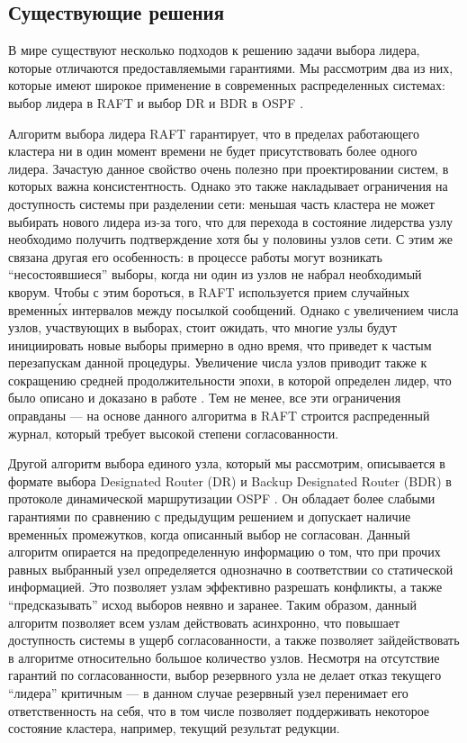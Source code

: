 \documentclass{article}
\theoremstyle{plain}
\theoremstyle{plain}
\theoremstyle{plain}
\theoremstyle{plain}
\theoremstyle{definition}
\theoremstyle{remark}
\theoremstyle{plain}
\begin{document}
\subsection{Существующие решения}

В мире существуют несколько подходов к решению задачи выбора лидера, которые отличаются предоставляемыми гарантиями. Мы рассмотрим два из них, которые имеют широкое применение в современных распределенных системах: выбор лидера в RAFT \cite{RAFT} и выбор DR и BDR в OSPF  \cite[с.~75]{RFC2328}.

Алгоритм выбора лидера RAFT гарантирует, что в пределах работающего кластера ни в один момент времени не будет присутствовать более одного лидера. Зачастую данное свойство очень полезно при проектировании систем, в которых важна консистентность. Однако это также накладывает ограничения на доступность системы при разделении сети: меньшая часть кластера не может выбирать нового лидера из-за того, что для перехода в состояние лидерства узлу необходимо получить подтверждение хотя бы у половины узлов сети. С этим же связана другая его особенность: в процессе работы могут возникать \enquote{несостоявшиеся} выборы, когда ни один из узлов не набрал необходимый кворум. Чтобы с этим бороться, в RAFT используется прием случайных временн\'{ы}х интервалов между посылкой сообщений. Однако с увеличением числа узлов, участвующих в выборах, стоит ожидать, что многие узлы будут инициировать новые выборы примерно в одно время, что приведет к частым перезапускам данной процедуры. Увеличение числа узлов приводит также к сокращению средней продолжительности эпохи, в которой определен лидер, что было описано и доказано в работе \cite{RAFT_performance_1808.01081}. Тем не менее, все эти ограничения оправданы --- на основе данного алгоритма в RAFT строится распреденный журнал, который требует высокой степени согласованности.

Другой алгоритм выбора единого узла, который мы рассмотрим, описывается в формате выбора Designated Router (DR) и Backup Designated Router (BDR) в протоколе динамической маршрутизации OSPF \cite[с.~75]{RFC2328}. Он обладает более слабыми гарантиями по сравнению с предыдущим решением и допускает наличие временн\'{ы}х промежутков, когда описанный выбор не согласован. Данный алгоритм опирается на предопределенную информацию о том, что при прочих равных выбранный узел определяется однозначно в соответствии со статической информацией. Это позволяет узлам эффективно разрешать конфликты, а также \enquote{предсказывать} исход выборов неявно и заранее. Таким образом, данный алгоритм позволяет всем узлам действовать асинхронно, что повышает доступность системы в ущерб согласованности, а также позволяет зайдействовать в алгоритме относительно большое количество узлов. Несмотря на отсутствие гарантий по согласованности, выбор резервного узла не делает отказ текущего \enquote{лидера} критичным --- в данном случае резервный узел перенимает его ответственность на себя, что в том числе позволяет поддерживать некоторое состояние кластера, например, текущий результат редукции.
\end{document}
